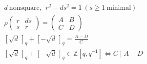 \documentclass{article}
\begin{document}
\[
\begin{aligned}
&d\ \text{nonsquare},\ \ r^{2}-ds^{2}=1\ (s\ge1\ \text{minimal})\\
&\rho\begin{pmatrix}r&ds\\ s&r\end{pmatrix}=\begin{pmatrix}A&B\\ C&D\end{pmatrix}\\
&[\sqrt d\,]_q+[-\sqrt d\,]_q=\frac{A-D}{C}\\
&[\sqrt d\,]_q+[-\sqrt d\,]_q\in\mathbb{Z}[q,q^{-1}]\iff C\mid A-D
\end{aligned}
\]
\end{document}
